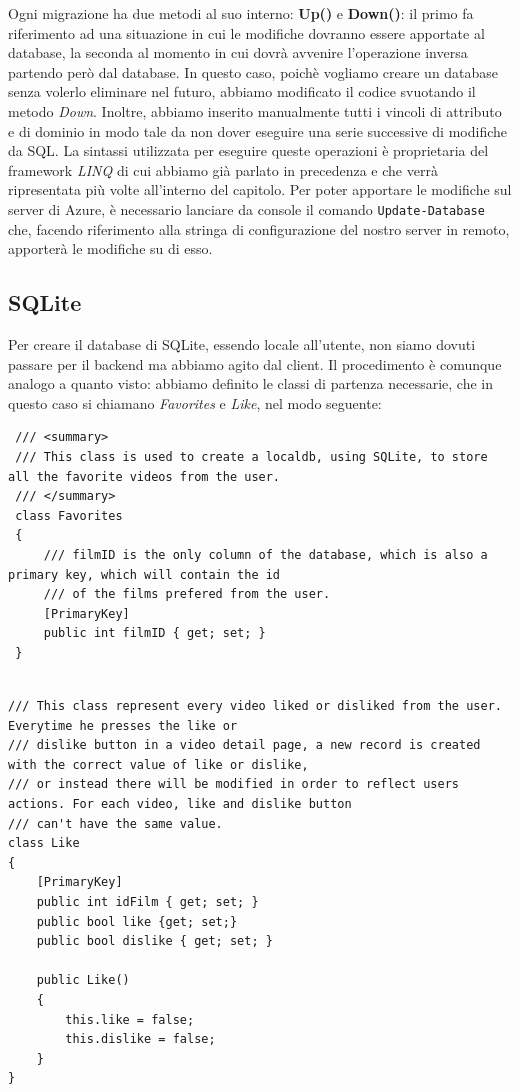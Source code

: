 \documentclass[a4]{book}
\begin{document}
Ogni migrazione ha due metodi al suo interno: \textbf{Up()} e \textbf{Down()}: il primo fa riferimento ad una situazione in cui le modifiche dovranno essere apportate al database, la seconda al momento in cui dovrà avvenire l'operazione inversa partendo però dal database. In questo caso, poichè vogliamo creare un database senza volerlo eliminare nel futuro, abbiamo modificato il codice svuotando il metodo \textit{Down}. Inoltre, abbiamo inserito manualmente tutti i vincoli di attributo e di dominio in modo tale da non dover eseguire una serie successive di modifiche da SQL. La sintassi utilizzata per eseguire queste operazioni è proprietaria del framework \textit{LINQ} di cui abbiamo già parlato in precedenza e che verrà ripresentata più volte all'interno del capitolo. \newline
Per poter apportare le modifiche sul server di Azure, è necessario lanciare da console il comando \texttt{Update-Database} che, facendo riferimento alla stringa di configurazione del nostro server in remoto, apporterà le modifiche su di esso.


\subsection{SQLite}
Per creare il database di SQLite, essendo locale all'utente, non siamo dovuti passare per il backend ma abbiamo agito dal client. Il procedimento è comunque analogo a quanto visto: abbiamo definito le classi di partenza necessarie, che in questo caso si chiamano \textit{Favorites} e \textit{Like}, nel modo seguente:

\begin{lstlisting}
 /// <summary>
 /// This class is used to create a localdb, using SQLite, to store all the favorite videos from the user.
 /// </summary>
 class Favorites
 {
	 /// filmID is the only column of the database, which is also a primary key, which will contain the id
	 /// of the films prefered from the user.
	 [PrimaryKey]
	 public int filmID { get; set; }
 }
\end{lstlisting}

\begin{lstlisting}

/// This class represent every video liked or disliked from the user. Everytime he presses the like or
/// dislike button in a video detail page, a new record is created with the correct value of like or dislike,
/// or instead there will be modified in order to reflect users actions. For each video, like and dislike button
/// can't have the same value.
class Like
{
	[PrimaryKey]
	public int idFilm { get; set; }
	public bool like {get; set;}
	public bool dislike { get; set; }
 
	public Like()
	{
		this.like = false;
		this.dislike = false;
	}
}
\end{lstlisting}
\end{document}
